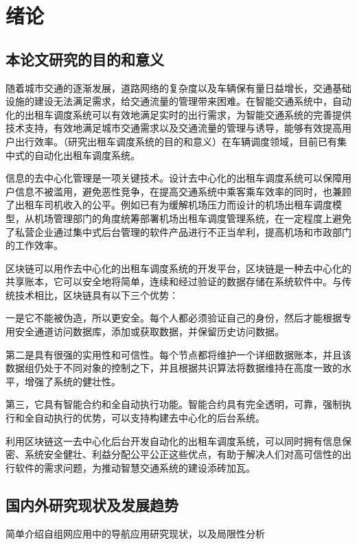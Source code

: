 \chapter{绪论}
\section{本论文研究的目的和意义}

随着城市交通的逐渐发展，道路网络的复杂度以及车辆保有量日益增长，交通基础设施的建设无法满足需求，给交通流量的管理带来困难。在智能交通系统中，自动化的出租车调度系统可以有效地满足实时的出行需求，为智能交通系统的完善提供技术支持，有效地满足城市交通需求以及交通流量的管理与诱导，能够有效提高用户出行效率。（研究出租车调度系统的目的和意义）在车辆调度领域，目前已有集中式的自动化出租车调度系统。\par
信息的去中心化管理是一项关键技术。设计去中心化的出租车调度系统可以保障用户信息不被滥用，避免恶性竞争，在提高交通系统中乘客乘车效率的同时，也兼顾了出租车司机收入的公平。例如已有为缓解机场压力而设计的机场出租车调度模型，从机场管理部门的角度统筹部署机场出租车调度管理系统，在一定程度上避免了私营企业通过集中式后台管理的软件产品进行不正当牟利，提高机场和市政部门的工作效率。\par
区块链可以用作去中心化的出租车调度系统的开发平台，区块链是一种去中心化的共享账本，它可以安全地将简单，连续和经过验证的数据存储在系统软件中。与传统技术相比，区块链具有以下三个优势：\par
一是它不能被伪造，所以更安全。每个人都必须验证自己的身份，然后才能根据专用安全通道访问数据库，添加或获取数据，并保留历史访问数据。\par
第二是具有很强的实用性和可信性。每个节点都将维护一个详细数据账本，并且该数据组仍处于不同对象的控制之下，并且根据共识算法将数据维持在高度一致的水平，增强了系统的健壮性。\par
第三，它具有智能合约和全自动执行功能。智能合约具有完全透明，可靠，强制执行和全自动执行的优势，可以支持构建去中心化的后台系统。\par
利用区块链这一去中心化后台开发自动化的出租车调度系统，可以同时拥有信息保密、系统安全健壮、利益分配公平公正这些优点，有助于解决人们对高可信性的出行软件的需求问题，为推动智慧交通系统的建设添砖加瓦。


\section{国内外研究现状及发展趋势}
简单介绍自组网应用中的导航应用研究现状，以及局限性分析
